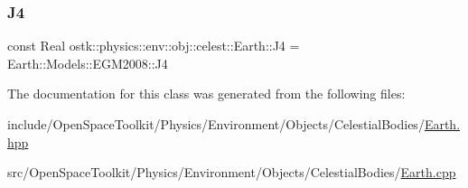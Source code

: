 \subsubsection{\texorpdfstring{J4}{J4}}
{\footnotesize\ttfamily const Real ostk\+::physics\+::env\+::obj\+::celest\+::\+Earth\+::\+J4 = Earth\+::\+Models\+::\+E\+G\+M2008\+::\+J4\hspace{0.3cm}{\ttfamily [static]}}



The documentation for this class was generated from the following files\+:\begin{DoxyCompactItemize}
\item 
include/\+Open\+Space\+Toolkit/\+Physics/\+Environment/\+Objects/\+Celestial\+Bodies/\hyperlink{_objects_2_celestial_bodies_2_earth_8hpp}{Earth.\+hpp}\item 
src/\+Open\+Space\+Toolkit/\+Physics/\+Environment/\+Objects/\+Celestial\+Bodies/\hyperlink{_objects_2_celestial_bodies_2_earth_8cpp}{Earth.\+cpp}\end{DoxyCompactItemize}
